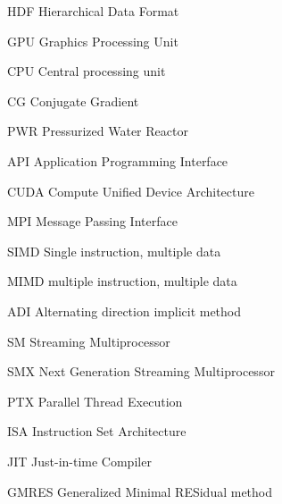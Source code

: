 \begin{denotation}

\item[HDF] Hierarchical Data Format
\item[GPU] Graphics Processing Unit
\item[CPU] Central processing unit
\item[CG] Conjugate Gradient
\item[\ProgramName] \ProgramFullName

\item[PWR] Pressurized Water Reactor
\item[API] Application Programming Interface
\item[CUDA] Compute Unified Device Architecture
\item[MPI] Message Passing Interface
\item[SIMD] Single instruction, multiple data
\item[MIMD] multiple instruction, multiple data
\item[ADI] Alternating direction implicit method
\item[SM] Streaming Multiprocessor
\item[SMX] Next Generation Streaming Multiprocessor
\item[PTX] Parallel Thread Execution
\item[ISA] Instruction Set Architecture
\item[JIT] Just-in-time Compiler
\item[GMRES] Generalized Minimal RESidual method

\end{denotation}
